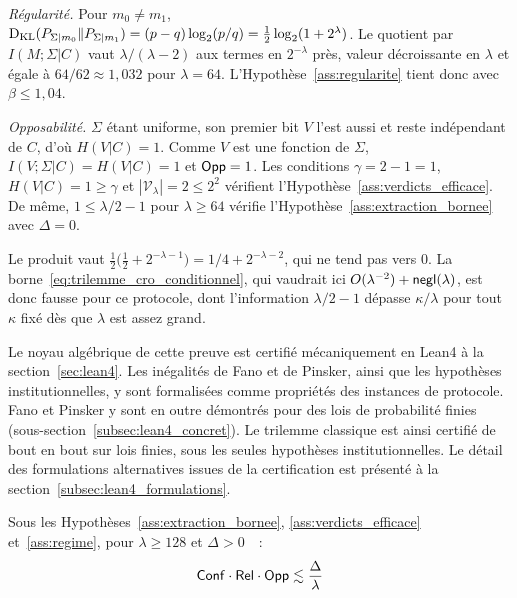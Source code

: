 \begin{sloppypar}
\begin{Preuve}
\emph{R\'egularit\'e.} Pour $m_0 \neq m_1$,
$\operatorname{D_{\text{KL}}}(P_{\Sigma|m_0}\|P_{\Sigma|m_1}) = (p-q)\log_2(p/q) = \tfrac12\log_2(1+2^\lambda)$.
Le quotient par $I(M;\Sigma|C)$ vaut $\lambda/(\lambda-2)$ aux termes en
$2^{-\lambda}$ pr\`es, valeur d\'ecroissante en $\lambda$ et \'egale \`a
$64/62 \approx 1{,}032$ pour $\lambda = 64$. L'Hypoth\`ese~\ref{ass:regularite}
tient donc avec $\beta \leq 1{,}04$.

\emph{Opposabilit\'e.} $\Sigma$ \'etant uniforme, son premier bit $V$ l'est aussi
et reste ind\'ependant de $C$, d'o\`u $H(V|C) = 1$. Comme $V$ est une fonction de
$\Sigma$, $I(V;\Sigma|C) = H(V|C) = 1$ et $\mathsf{Opp} = 1$. Les conditions
$\gamma = 2 - 1 = 1$, $H(V|C) = 1 \geq \gamma$ et $|\mathcal{V}_\lambda| = 2 \leq 2^{2}$
v\'erifient l'Hypoth\`ese~\ref{ass:verdicts_efficace}. De m\^eme,
$1 \leq \lambda/2 - 1$ pour $\lambda \geq 64$ v\'erifie
l'Hypoth\`ese~\ref{ass:extraction_bornee} avec $\Delta = 0$.

Le produit vaut $\tfrac12\bigl(\tfrac12 + 2^{-\lambda-1}\bigr) = 1/4 + 2^{-\lambda-2}$,
qui ne tend pas vers $0$. La borne~\eqref{eq:trilemme_cro_conditionnel}, qui
vaudrait ici $O(\lambda^{-2}) + \mathsf{negl}(\lambda)$, est donc fausse pour ce
protocole, dont l'information $\lambda/2 - 1$ d\'epasse $\kappa/\lambda$ pour tout
$\kappa$ fix\'e d\`es que $\lambda$ est assez grand.
\end{Preuve}

\begin{remark}
\label{rem:statut_verification_classique}
Le noyau alg\'ebrique de cette preuve est certifi\'e m\'ecaniquement en
Lean4 \`a la section~\ref{sec:lean4}. Les in\'egalit\'es de Fano et de
Pinsker, ainsi que les hypoth\`eses institutionnelles, y sont
formalis\'ees comme propri\'et\'es des instances de protocole. Fano et Pinsker
y sont en outre d\'emontr\'es pour des lois de probabilit\'e finies
(sous-section~\ref{subsec:lean4_concret}). Le trilemme classique est ainsi certifi\'e de bout en
bout sur lois finies, sous les seules hypoth\`eses institutionnelles. Le
d\'etail des formulations alternatives issues de la certification est pr\'esent\'e \`a la
section~\ref{subsec:lean4_formulations}.
\end{remark}

\begin{corollary}\label{cor:forme_simplifiee}

Sous les Hypoth\`eses~\ref{ass:extraction_bornee}, \ref{ass:verdicts_efficace}
et~\ref{ass:regime}, pour $\lambda \geq 128$ et $\Delta > 0$~\cite{Goldreich01,KatzLindell14}~:
\begin{equation}
\mathsf{Conf} \cdot \mathsf{Rel} \cdot \mathsf{Opp} \lesssim \frac{\Delta}{\lambda}
\label{eq:trilemme_simplifie}
\end{equation}


\end{corollary}
\end{sloppypar}
